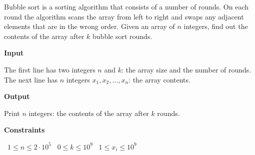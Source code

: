 Bubble sort is a sorting algorithm that consists of a number of rounds. On each round the algorithm scans the array from left to right and swaps any adjacent elements that are in the wrong order.
Given an array of $n$ integers, find out the contents of the array after $k$ bubble sort rounds.

\vspace{0.3cm}\noindent\textbf{Input}

The first line has two integers $n$ and $k$: the array size and the number of rounds.
The next line has $n$ integers $x_1,x_2,\dots,x_n$: the array contents.

\vspace{0.3cm}\noindent\textbf{Output}

Print $n$ integers: the contents of the array after $k$ rounds.

\vspace{0.3cm}\noindent\textbf{Constraints}

\textbullet\ $1 \le n \le 2 \cdot 10^5$
\textbullet\ $0 \le k \le 10^9$
\textbullet\ $1 \le x_i \le 10^9$